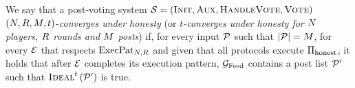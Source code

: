 \begin{definition}
  We say that a post-voting system $\mathcal{S} = \left(\textsc{Init}, \textsc{Aux},
  \textsc{HandleVote}, \textsc{Vote}\right)$ $\left(N, R,
  M, t\right)$-\emph{converges under honesty} (or \emph{$t$-converges
  under honesty for $N$ players, $R$ rounds and $M$
  posts}) if, for every input $\mathcal{P}$ such that $|\mathcal{P}| = M$,
  for every $\mathcal{E}$ that respects $\mathrm{ExecPat}_{N, R}$ and given that
  all protocols execute $\Pi_{\mathrm{honest}}$, it holds that after $\mathcal{E}$ completes its
  execution pattern, $\mathcal{G}_{\mathrm{Feed}}$ contains a post list $\mathcal{P}'$ such that
  $\textsc{Ideal}^t\left(\mathcal{P}'\right)$ is true.
\end{definition}

